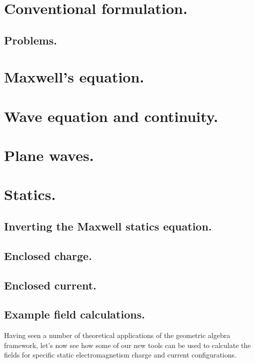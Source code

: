 %
%
      \section{Conventional formulation.}
         
         \subsection{Problems.}
            
      \section{Maxwell's equation.}
         
      \section{Wave equation and continuity.}
         
      \section{Plane waves.}
         
      \section{Statics.}
         \subsection{Inverting the Maxwell statics equation.}
            
         \subsection{Enclosed charge.}
            
         \subsection{Enclosed current.}
            
         \subsection{Example field calculations.}
            Having seen a number of theoretical applications of the geometric algebra framework, let's now see how some of our new tools can be used to calculate the fields for specific static electromagnetism charge and current configurations.
